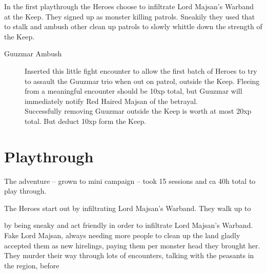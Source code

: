 \noindent
In the first playthrough the Heroes choose to infiltrate Lord Majsan's Warband at the Keep. They signed up as monster killing patrols. Sneakily they used that to stalk and ambush other clean up patrols to slowly whittle down the strength of the Keep.

\begin{description}

\item[Guuzmar Ambush] Inserted this little fight encounter to allow the first batch of Heroes to try to assault the Guuzmar trio when out on patrol, outside the Keep.
Fleeing from a meaningful encounter should be 10xp total, but Guuzmar will immediately notify Red Haired Majsan of the betrayal.\\
Successfully removing Guuzmar outside the Keep is worth at most 20xp total. But deduct 10xp form the Keep.

\end{description}


















\clearpage
{}
\section*{Playthrough}

The adventure -- grown to mini campaign -- took 15 sessions and ca 40h total to play through.







The Heroes start out by infiltrating Lord Majsan's Warband. They walk up to

by being sneaky and act friendly in order to infiltrate Lord Majsan's Warband. Fake Lord Majsan, always needing more people to clean up the land gladly accepted them as new hirelings, paying them per monster head they brought her. They murder their way through lots of encounters, talking with the peasants in the region,  before

